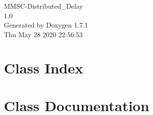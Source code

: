 \documentclass[a4paper]{book}
\begin{document}
\begin{titlepage}
\vspace*{7cm}
\begin{center}
{\Large MMSC-\/Distributed\_\-Delay \\[1ex]\large 1.0 }\\
\vspace*{1cm}
{\large Generated by Doxygen 1.7.1}\\
\vspace*{0.5cm}
{\small Thu May 28 2020 22:56:53}\\
\end{center}
\end{titlepage}
\clearemptydoublepage
{}
\tableofcontents
\clearemptydoublepage
{}
\chapter{Class Index}

\chapter{Class Documentation}


\printindex
\end{document}
